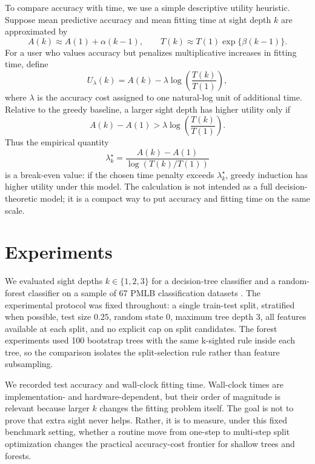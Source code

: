 \documentclass[pdflatex,sn-mathphys-num]{sn-jnl}
\begin{document}
To compare accuracy with time, we use a simple descriptive utility heuristic. Suppose mean predictive accuracy and mean fitting time at sight depth $k$ are approximated by
\begin{equation}
A(k) \approx A(1) + \alpha(k-1),
\qquad
T(k) \approx T(1)\exp\{\beta(k-1)\}.
\end{equation}
For a user who values accuracy but penalizes multiplicative increases in fitting time, define
\begin{equation}
U_\lambda(k) = A(k) - \lambda \log\left(\frac{T(k)}{T(1)}\right),
\label{eq:utility}
\end{equation}
where $\lambda$ is the accuracy cost assigned to one natural-log unit of additional time. Relative to the greedy baseline, a larger sight depth has higher utility only if
\begin{equation}
A(k)-A(1) > \lambda \log\left(\frac{T(k)}{T(1)}\right).
\end{equation}
Thus the empirical quantity
\[
\lambda^\star_k =
\frac{A(k)-A(1)}{\log(T(k)/T(1))}
\]
is a break-even value: if the chosen time penalty exceeds $\lambda^\star_k$, greedy induction has higher utility under this model. The calculation is not intended as a full decision-theoretic model; it is a compact way to put accuracy and fitting time on the same scale.

\section{Experiments}\label{sec:experiments}

We evaluated sight depths $k \in \{1,2,3\}$ for a decision-tree classifier and a random-forest classifier on a sample of 67 PMLB classification datasets \cite{olson2017pmlb}. The experimental protocol was fixed throughout: a single train-test split, stratified when possible, test size $0.25$, random state $0$, maximum tree depth $3$, all features available at each split, and no explicit cap on split candidates. The forest experiments used 100 bootstrap trees with the same k-sighted rule inside each tree, so the comparison isolates the split-selection rule rather than feature subsampling.

We recorded test accuracy and wall-clock fitting time. Wall-clock times are implementation- and hardware-dependent, but their order of magnitude is relevant because larger $k$ changes the fitting problem itself. The goal is not to prove that extra sight never helps. Rather, it is to measure, under this fixed benchmark setting, whether a routine move from one-step to multi-step split optimization changes the practical accuracy-cost frontier for shallow trees and forests.
\end{document}
